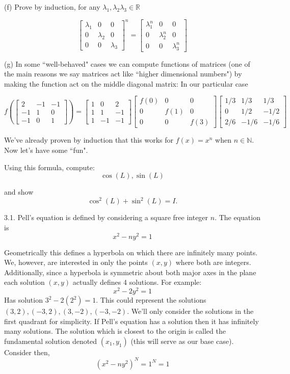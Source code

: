 \documentclass[16 pt]{amsart}
\theoremstyle{definition}
\theoremstyle{remark}
\numberwithin{equation}{subsection}
\newcommand{\R}{\mathbb{R}}
\begin{document}
(f) Prove by induction, for any $\lambda_1,\lambda_2\lambda_3\in\R$

\[
\begin{bmatrix}
\lambda_1 & 0 & 0\\
0 & \lambda_2 & 0\\
0 & 0 & \lambda_3
\end{bmatrix}^n = 
\begin{bmatrix}
\lambda_1^n & 0 & 0\\
0 & \lambda_2^n & 0\\
0 & 0 & \lambda_3^n
\end{bmatrix}
\]


(g) In some ``well-behaved" cases we can compute functions of matrices (one of the main reasons we say matrices act like ``higher dimensional numbers") by making the function act on the middle diagonal matrix:  In our particular case

\[
f\left(\begin{bmatrix}
2 & -1 & -1 \\
-1 & 1 & 0\\
-1 & 0 & 1
\end{bmatrix}\right) = 
\begin{bmatrix}
1 & 0 & 2 \\
1 & 1 & -1\\
1 & -1 & -1
\end{bmatrix}
\begin{bmatrix}
f(0) & 0 & 0 \\
0 & f(1) & 0\\
0 & 0 & f(3)
\end{bmatrix}
\begin{bmatrix}
1/3 & 1/3 & 1/3 \\
0 & 1/2 & -1/2\\
2/6 & -1/6 & -1/6
\end{bmatrix}
\]

We've already proven by induction that this works for $f(x)=x^n$ when $n\in\mathbb{N}$.  Now let's have some ``fun".

Using this formula, compute:
\[
\cos(L),\sin(L)
\]

and show 
\[
\cos^2(L)+\sin^2(L) = I.
\]

\newpage

3.1.  Pell's equation is defined by considering a square free integer $n$.  The equation is
\[
x^2 - ny^2 = 1
\]

Geometrically this defines a hyperbola on which there are infinitely many points.  We, however, are interested in only the points $(x,y)$ where both are integers.  Additionally, since a hyperbola is symmetric about both major axes in the plane each solution $(x,y)$ actually defines 4 solutions.  For example:
\[
x^2 - 2y^2 =1
\]
Has solution $3^2 - 2 (2^2)=1$.  This could represent the solutions $(3,2),(-3,2),(3,-2),(-3,-2)$.  We'll only consider the solutions in the first quadrant for simplicity.  If Pell's equation has a solution then it has infinitely many solutions.  The solution which is closest to the origin is called the fundamental solution denoted $(x_1,y_1)$ (this will serve as our base case).  Consider then,
\[
(x^2-ny^2)^N = 1^N = 1
\]
\end{document}
